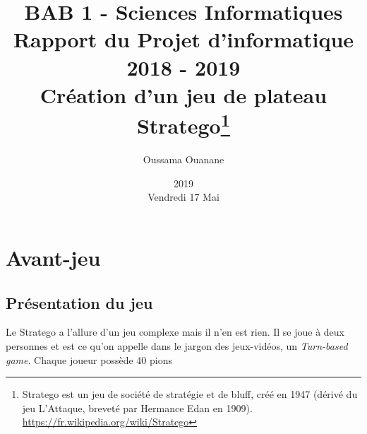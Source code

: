 \documentclass[a4paper, 12pt]{report}
\title{BAB 1 - Sciences Informatiques \\  Rapport du Projet d'informatique 2018 - 2019 \\ Création d'un jeu de plateau Stratego\thanks{Stratego est un jeu de société de stratégie et de bluff, créé en 1947 (dérivé du jeu L'Attaque, breveté par Hermance Edan en 1909). \underline{https://fr.wikipedia.org/wiki/Stratego}}}
\author{Oussama Ouanane}
\date{2019\\ Vendredi 17 Mai}
\begin{document}

\begin{titlepage}
\clearpage\maketitle
\thispagestyle{empty}
\end{titlepage}


\begin{table}
\tableofcontents
\end{table}
\part{Avant-jeu}
\chapter{Présentation du jeu}
Le Stratego a l'allure d'un jeu complexe mais il n'en est rien. Il se joue à deux personnes et est ce qu'on appelle dans le jargon des jeux-vidéos, un \textit{Turn-based game}. Chaque joueur possède 40 pions
\end{document}
